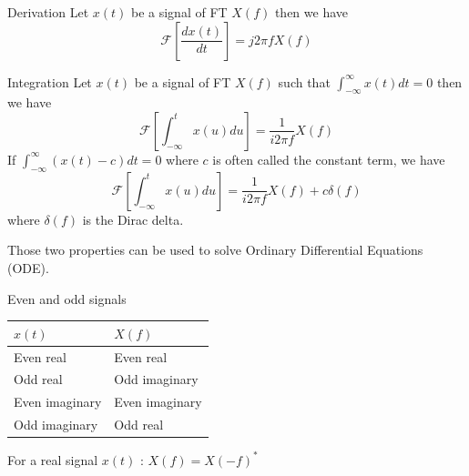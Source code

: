 \begin{block}{Derivation}
    Let $x(t)$ be a signal of FT $X(f)$ then we have 
  $$
  \mathcal{F}\left[\frac{d x(t)}{ dt }\right]=  j 2 \pi f X(f)
  $$
  \end{block}
  
  
  \begin{block}{Integration}
    Let $x(t)$ be a signal of FT $X(f)$ such that
    $\int_{-\infty}^\infty x(t) dt = 0$ then we have
  $$
  \mathcal{F}\left[\int_{-\infty}^t x(u) du \right]= \frac{1}{i 2 \pi f }  X(f)
  $$
  If   $\int_{-\infty}^\infty (x(t)-c) dt = 0$ where $c$ is often called the constant term, we have
  $$
  \mathcal{F}\left[\int_{-\infty}^t x(u) du \right]= \frac{1}{i 2 \pi f }  X(f)+ c\delta(f)
  $$
  where $\delta(f)$ is the Dirac delta.
  \end{block}

  Those two properties can be used to solve Ordinary Differential Equations
  (ODE).
  


\begin{block}{Even and odd signals}
    \begin{center}
      \begin{tabular}{|l|l|}
        \hline
        $x(t)$ & $X(f)$\\ \hline
        Even real & Even real \\
        Odd real & Odd imaginary \\
        Even imaginary & Even imaginary\\
        Odd imaginary & Odd real\\ \hline
      \end{tabular}
    
      
    \end{center}
    For a real signal $x(t)$ : $X(f)=X(-f)^*$ 
    \end{block}
    
    
    
